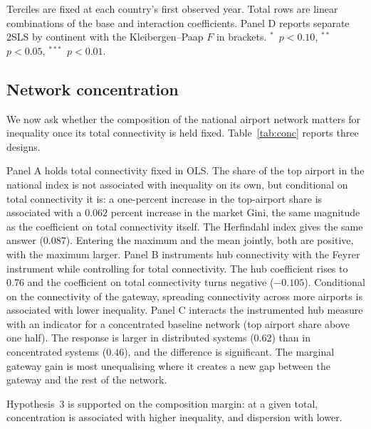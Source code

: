 \documentclass[12pt]{article}
\newcommand{\sym}[1]{\ensuremath{^{#1}}}
\begin{document}
\begin{table}[H]\centering\caption{Heterogeneity: interaction 2SLS with the Feyrer instrument (robust SE).}\label{tab:hetero}
\begin{threeparttable}\small
\begin{tablenotes}\footnotesize\item Terciles are fixed at each country's first observed year. Total rows are linear combinations of the base and interaction coefficients. Panel D reports separate 2SLS by continent with the Kleibergen--Paap $F$ in brackets. \sym{*}~$p<0.10$, \sym{**}~$p<0.05$, \sym{***}~$p<0.01$.\end{tablenotes}\end{threeparttable}\end{table}

\subsection{Network concentration}
\label{sec:conc}
We now ask whether the composition of the national airport network matters for inequality once its total connectivity is held fixed. Table~\ref{tab:conc} reports three designs.

Panel A holds total connectivity fixed in OLS. The share of the top airport in the national index is not associated with inequality on its own, but conditional on total connectivity it is: a one-percent increase in the top-airport share is associated with a $0.062$ percent increase in the market Gini, the same magnitude as the coefficient on total connectivity itself. The Herfindahl index gives the same answer ($0.087$). Entering the maximum and the mean jointly, both are positive, with the maximum larger. Panel B instruments hub connectivity with the Feyrer instrument while controlling for total connectivity. The hub coefficient rises to $0.76$ and the coefficient on total connectivity turns negative ($-0.105$). Conditional on the connectivity of the gateway, spreading connectivity across more airports is associated with lower inequality. Panel C interacts the instrumented hub measure with an indicator for a concentrated baseline network (top airport share above one half). The response is larger in distributed systems ($0.62$) than in concentrated systems ($0.46$), and the difference is significant. The marginal gateway gain is most unequalising where it creates a new gap between the gateway and the rest of the network.

Hypothesis~3 is supported on the composition margin: at a given total, concentration is associated with higher inequality, and dispersion with lower.
\end{document}
